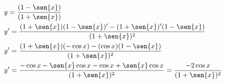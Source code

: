 \begin{ex}
\begin{align}
&y=\frac{(1-\sen{x})}{(1+\sen{x})}\nonumber\\
&y'=\frac{(1+\sen{x})(1-\sen{x})'-(1+\sen{x})'(1-\sen{x})}{(1+\sen{x})^2}\nonumber\\
&y'=\frac{(1+\sen{x})(-\cos{x})-(\cos{x})(1-\sen{x})}{(1+\sen{x})^2}\nonumber\\
&y'=\frac{-\cos{x}-\sen{x}\cos{x}-\cos{x}+\sen{x}\cos{x}}{(1+\sen{x})^2}=\frac{-2\cos{x}}{(1+\sen{x})^2}\nonumber
\end{align}
\end{ex}